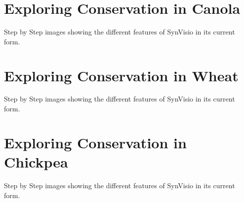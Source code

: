 \documentclass{uofsthesis-cs}
\begin{document}
\begin{appendices}

\chapter{Exploring Conservation in Canola}

Step by Step images showing the different features of SynVisio in its current form.

\chapter{Exploring Conservation in Wheat}

Step by Step images showing the different features of SynVisio in its current form.

\chapter{Exploring Conservation in Chickpea}

Step by Step images showing the different features of SynVisio in its current form.

\end{appendices}
\end{document}
